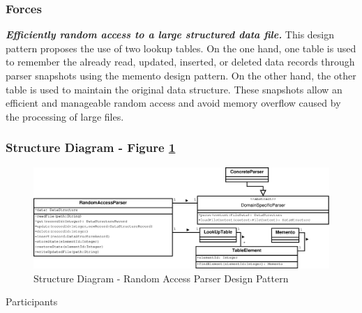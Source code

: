 \subsubsection{Forces}
\textbf{\textit{Efficiently random access to a large structured data file.}} This design pattern proposes the use of two lookup tables. On the one hand, one table is used to remember the already read, updated, inserted, or deleted data records through parser snapshots using the memento design pattern. On the other hand, the other table is used to maintain the original data structure. These snapshots allow an efficient and manageable random access and avoid memory overflow caused by the processing of large files.

\subsubsection{Structure Diagram - Figure \ref{fig:str_diagram_rap}}

\begin{figure}
	\centering
	\includegraphics*[width=1\textwidth, keepaspectratio=false]{fig/image1.eps}
	\caption{Structure Diagram - Random Access Parser Design Pattern}
	\label{fig:str_diagram_rap}
\end{figure}

\begin{description}
	\item[Participants]
\end{description}

